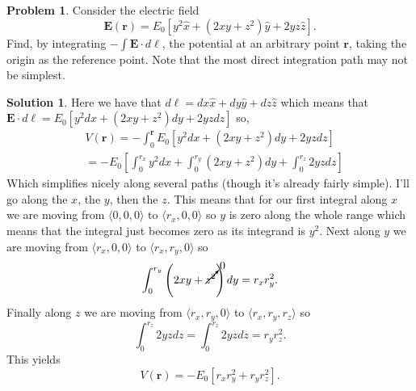 \documentclass[10pt]{article}
\theoremstyle{definition}
\newtheorem{problem}{Problem}
\newtheorem{soln}{Solution}
\newcommand{\ux}{\hat{x}}
\newcommand{\uy}{\hat{y}}
\newcommand{\uz}{\hat{z}}
\begin{document}
\begin{problem}
Consider the electric field
$$\mathbf{E}(\mathbf{r})=E_0\left[y^2\ux+\left(2xy+z^2\right)\uy+2yz\uz\right].$$
Find, by integrating $-\int\mathbf{E}\cdot d\boldsymbol{\ell}$, the potential at an arbitrary point $\mathbf{r}$, taking the origin as the reference point.
Note that the most direct integration path may not be simplest.
\end{problem}
\begin{soln}
  Here we have that $d\boldsymbol{\ell}=dx\ux+dy\uy+dz\uz$ which means that
  $\mathbf{E}\cdot d\boldsymbol{\ell}=E_0\left[y^2dx+\left(2xy+z^2\right)dy+2yzdz\right]$ so,
  \begin{align*}
     & V(\mathbf{r})= -\int_0^{\mathbf{r}}E_0\left[y^2dx+\left(2xy+z^2\right)dy+2yzdz\right]     \\
     & = -E_0\left[\int_0^{r_x}y^2dx+\int_0^{r_y}\left(2xy+z^2\right)dy+\int_0^{r_z}2yzdz\right]
  \end{align*}
  Which simplifies nicely along several paths (though it's already fairly simple). I'll go along the $x$, the $y$, then the $z$.
  This means that for our first integral along $x$ we are moving from $\langle0,0,0\rangle$ to $\langle r_x,0,0\rangle$ so $y$ is zero
  along the whole range which means that the integral just becomes zero as its integrand is $y^2$. Next along
  $y$ we are moving from $\langle r_x,0,0\rangle$ to $\langle r_x,r_y,0\rangle$ so
  $$\int_0^{r_y}\left(2xy+\cancelto{0}{z^2}\right)dy=r_xr_y^2.$$
  Finally along $z$ we are moving from $\langle r_x,r_y,0\rangle$ to $\langle r_x,r_y,r_z\rangle$ so
  $$\int_0^{r_z}2yzdz=\int_0^{r_z}2yzdz=r_yr_z^2.$$
  This yields
  $$V(\mathbf{r})=-E_0\left[r_xr_y^2 + r_yr_z^2\right].$$
\end{soln}
\end{document}
